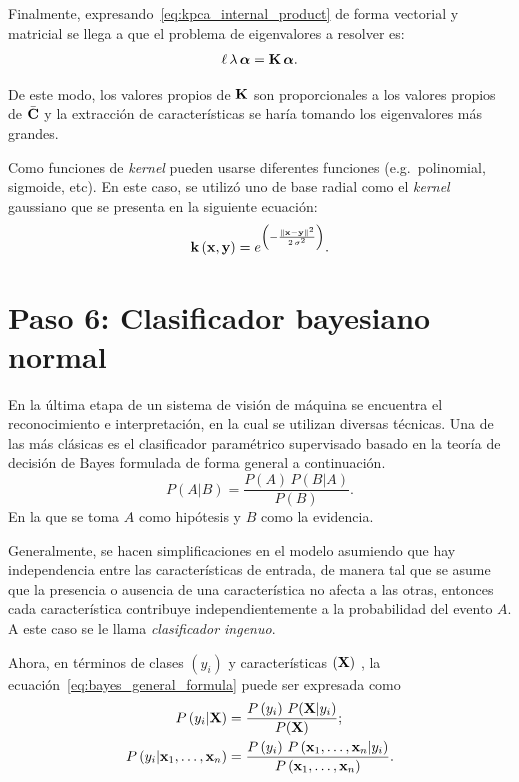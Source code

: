 Finalmente, expresando~\eqref{eq:kpca_internal_product} de forma vectorial y matricial se llega a que el problema de eigenvalores a resolver es:
%
\begin{equation}
    \ell\,\lambda\,\boldsymbol{\alpha} = \mathrm{\mathbf{K}}\,\boldsymbol{\alpha}.
\end{equation}

De este modo, los valores propios de $\mathrm{\mathbf{K}}$ son proporcionales a los valores propios de $\bar{\mathrm{\mathbf{C}}}$ y la extracción de características se haría tomando los eigenvalores más grandes.

Como funciones de \emph{kernel} pueden usarse diferentes funciones (e.g.\ polinomial, sigmoide, etc).
En este caso, se utilizó uno de base radial como el \emph{kernel} gaussiano que se presenta en la siguiente ecuación:
%
\begin{equation}
    \label{eq:kpca_gaussian}
    \vect{k}\left(\vect{x}, \vect{y}\right) = e^{\left(-\frac{\|\vect{x} - \vect{y}\|^2}{2\,\sigma^2}\right)}.
\end{equation}

\section*{Paso 6: Clasificador bayesiano normal}
\label{sec:nb_classifier}
En la última etapa de un sistema de visión de máquina se encuentra el reconocimiento e interpretación, en la cual se utilizan diversas técnicas.
Una de las más clásicas es el clasificador paramétrico supervisado basado en la teoría de decisión de Bayes formulada de forma general a continuación.
%
\begin{equation}
    \label{eq:bayes_general_formula}
    P(A|B) = \frac{P(A)\,P(B|A)}{P(B)}.
\end{equation}
%
En la que se toma $A$ como hipótesis y $B$ como la evidencia.

Generalmente, se hacen simplificaciones en el modelo asumiendo que hay independencia entre las características de entrada, de manera tal que se asume que la presencia o ausencia de una característica no afecta a las otras, entonces cada característica contribuye independientemente a la probabilidad del evento $A$.
A este caso se le llama \emph{clasificador ingenuo}.

Ahora, en términos de clases $\left(y_i\right)$ y características $\left(\mathrm{\mathbf{X}}\right)$ , la ecuación~\eqref{eq:bayes_general_formula} puede ser expresada como
%
\begin{subequations}
    \begin{align}
        P\left(y_i|\vect{X}\right) &= \frac{P\left(y_i\right)\,P(\vect{X}|y_i)}{P(\vect{X})}; \\
        P\left(y_i | \vect{x}_1, \dots, \vect{x}_n\right) &=
        \frac{P\left(y_i\right)\,P\left(\vect{x}_1, \dots, \vect{x}_n | y_i\right)}
        {P\left(\vect{x}_1, \dots, \vect{x}_n\right)}. \label{eq:bayes_features_formula}
    \end{align}
\end{subequations}

